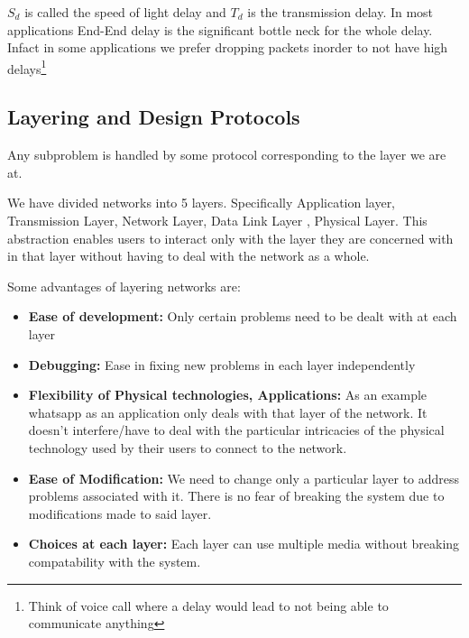 \documentclass[12pt]{article}
\newcommand{\tbox}[1]{\noindent\fbox{\parbox{\textwidth}{#1}}}
\begin{document}
\(S_d\) is called the speed of light delay and \(T_d\) is the transmission delay. 
In most applications End-End delay is the significant bottle neck for the whole delay. Infact in some applications 
we prefer dropping packets inorder to not have high delays\footnote{Think of voice call where a delay would lead to not being able to communicate anything}


\subsection{Layering and Design Protocols}
Any subproblem is handled by some protocol corresponding to the layer we are at. 

We have divided networks into 
5 layers. Specifically Application layer, Transmission Layer, Network Layer, Data Link Layer , Physical Layer.  
This abstraction enables users to interact only with the layer they are concerned with in that layer without having to deal with the 
network as a whole. 

Some advantages of layering networks are:
\begin{itemize}
    \item \textbf{Ease of development:} Only certain problems need to be dealt with at each layer
    \item \textbf{Debugging:} Ease in fixing new problems in each layer independently
    \item \textbf{Flexibility of Physical technologies, Applications:} As an example whatsapp as an application 
    only deals with that layer of the network. It doesn't interfere/have to deal with the particular intricacies of the 
    physical technology used by their users to connect to the network.
    \item \textbf{Ease of Modification:} We need to change only a particular layer to address problems associated with it. There is no fear of breaking the system due to modifications
    made to said layer.
    \item \textbf{Choices at each layer:} Each layer can use multiple media without breaking compatability with the system. 
\end{itemize}



\noindent\tbox{
    \begin{center}
    \textbf{\Huge Lecture 3}
    \end{center}
}
\end{document}
